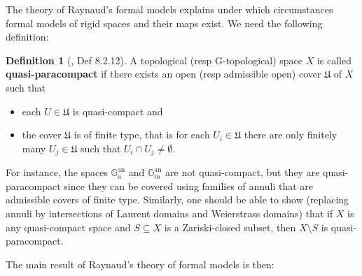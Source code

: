 \documentclass[11pt,oneside]{amsart}
\theoremstyle{definition}
\newtheorem{definition}[theorem]{Definition}
\theoremstyle{remark}
\begin{document}
	The theory of Raynaud's formal models explains under which circumstances formal models of rigid spaces and their maps exist. We need the following definition:
	
	\begin{definition}[\cite{Bosch lectures}, Def 8.2.12]
	A topological (resp G-topological) space $X$ is called \textbf{quasi-paracompact} if there exists an open (resp admissible open) cover $\mathfrak U$ of $X$ such that
	\begin{itemize}
		\item each $U\in \mathfrak U$ is quasi-compact and
		\item the cover $\mathfrak U$ is of finite type, that is for each $U_i \in \mathfrak U$ there are only finitely many $U_j \in \mathfrak U$ such that $U_i\cap U_j\ne\emptyset$.
	\end{itemize}
	For instance, the spaces $\mathbb G_a^{\operatorname{an}}$ and $\mathbb G_m^{\operatorname{an}}$ are not quasi-compact, but they are quasi-paracompact since they can be covered using families of annuli that are admissible covers of finite type. Similarly, one should be able to show (replacing annuli by intersections of Laurent domains and Weierstrass domains) that if $X$ is any quasi-compact space and $S\subseteq X$ is a Zariski-closed subset, then $X\setminus S$ is quasi-paracompact.
	\end{definition}
		
	The main result of Raynaud's theory of formal models is then:
	
\end{document}

